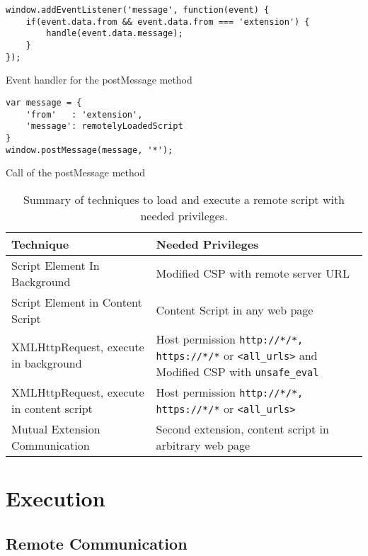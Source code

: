 	\begin{code}
		\begin{lstlisting}
window.addEventListener('message', function(event) {
	if(event.data.from && event.data.from === 'extension') {
		handle(event.data.message);
	}
});
\end{lstlisting}
		\caption{Event handler for the postMessage method}
		\label{postMessageListener}
	\end{code}
	
	\begin{code}
		\begin{lstlisting}
var message = {
	'from'   : 'extension',
	'message': remotelyLoadedScript
}
window.postMessage(message, '*');
\end{lstlisting}
		\caption{Call of the postMessage method}
		\label{postMessageMethod}
	\end{code}
	

	\begin{table}[h]
		\centering
		\begin{tabular}{|l|p{}|} \hline
			\textbf{Technique} & \textbf{Needed Privileges} \\ \hline
			Script Element In Background & Modified CSP with remote server URL \\
			Script Element in Content Script & Content Script in any web page \\
			XMLHttpRequest, execute in background & Host permission \texttt{http://*/*, https://*/*} or \texttt{<all\_urls>} and Modified CSP with \texttt{unsafe\_eval} \\
			XMLHttpRequest, execute in content script & Host permission \texttt{http://*/*, https://*/*} or \texttt{<all\_urls>} \\
			Mutual Extension Communication & Second extension, content script in arbitrary web page 
			\\ \hline
		\end{tabular}
		\caption{Summary of techniques to load and execute a remote script with needed privileges.}
		\label{tab:permissionsLoadScript}
	\end{table}
	

\section{Execution}

\subsection{Remote Communication}

